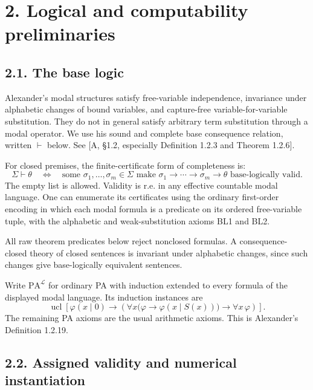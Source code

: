 \documentclass[
  11pt,
  letterpaper,
]{article}
\begin{document}
\section{2. Logical and computability
preliminaries}\label{logical-and-computability-preliminaries}

\subsection{2.1. The base logic}\label{the-base-logic}

Alexander's modal structures satisfy free-variable independence,
invariance under alphabetic changes of bound variables, and capture-free
variable-for-variable substitution. They do not in general satisfy
arbitrary term substitution through a modal operator. We use his sound
and complete base consequence relation, written \(\vdash\) below. See
{[}A, §1.2, especially Definition 1.2.3 and Theorem 1.2.6{]}.

For closed premises, the finite-certificate form of completeness is: \[
\Sigma\vdash\theta
\quad\Longleftrightarrow\quad
\text{some }\sigma_1,\ldots,\sigma_m\in\Sigma
\text{ make }
\sigma_1\to\cdots\to\sigma_m\to\theta
\text{ base-logically valid}.
\tag{L1}
\] The empty list is allowed. Validity is r.e. in any effective
countable modal language. One can enumerate its certificates using the
ordinary first-order encoding in which each modal formula is a predicate
on its ordered free-variable tuple, with the alphabetic and
weak-substitution axioms BL1 and BL2.

All raw theorem predicates below reject nonclosed formulas. A
consequence-closed theory of closed sentences is invariant under
alphabetic changes, since such changes give base-logically equivalent
sentences.

Write \(\mathrm{PA}^{\mathcal L}\) for ordinary PA with induction
extended to every formula of the displayed modal language. Its induction
instances are \[
\operatorname{ucl}\left[
\varphi(x\mid0)\to
\left(\forall x\bigl(\varphi\to\varphi(x\mid S(x))\bigr)
 \to\forall x\,\varphi\right)\right].
\tag{L2}
\] The remaining PA axioms are the usual arithmetic axioms. This is
Alexander's Definition 1.2.19.

\subsection{2.2. Assigned validity and numerical
instantiation}\label{assigned-validity-and-numerical-instantiation}
\end{document}
